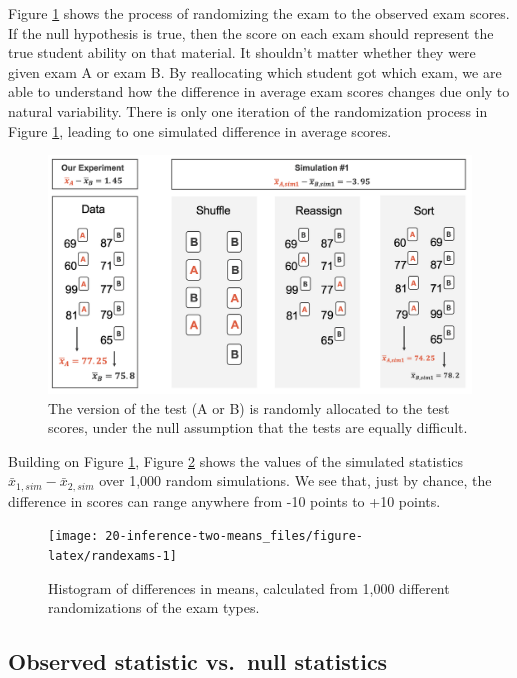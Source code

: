 \documentclass[
  10pt,
  openany]{book}
\begin{document}
Figure \ref{fig:rand2means} shows the process of randomizing the exam to the observed exam scores.
If the null hypothesis is true, then the score on each exam should represent the true student ability on that material.
It shouldn't matter whether they were given exam A or exam B.
By reallocating which student got which exam, we are able to understand how the difference in average exam scores changes due only to natural variability.
There is only one iteration of the randomization process in Figure \ref{fig:rand2means}, leading to one simulated difference in average scores.

\begin{figure}[h]

{\centering \includegraphics[width=0.75\linewidth]{images/rand2means} 

}

\caption{The version of the test (A or B) is randomly allocated to the test scores, under the null assumption that the tests are equally difficult.}\label{fig:rand2means}
\end{figure}

Building on Figure \ref{fig:rand2means}, Figure \ref{fig:randexams} shows the values of the simulated statistics \(\bar{x}_{1, sim} - \bar{x}_{2, sim}\) over 1,000 random simulations.
We see that, just by chance, the difference in scores can range anywhere from -10 points to +10 points.

\begin{figure}[h]

{\centering \texttt{[image: 20-inference-two-means\_files/figure-latex/randexams-1]} 

}

\caption{Histogram of differences in means, calculated from 1,000 different randomizations of the exam types.}\label{fig:randexams}
\end{figure}

\hypertarget{observed-statistic-vs.-null-statistics-5}{%
\subsection{Observed statistic vs.~null statistics}\label{observed-statistic-vs.-null-statistics-5}}
\end{document}

